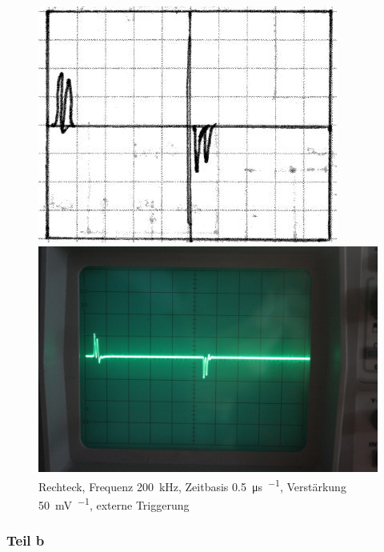 \begin{figure}
	\centering
	\begin{minipage}{.45\linewidth}
	\includegraphics[width=\linewidth]{Skizzen/IMG_0765-1500.jpg}
	\end{minipage}
	\hfill
	\begin{minipage}{.45\linewidth}
	\includegraphics[width=\linewidth]{Fotos/IMG_0765-1500.jpg}
	\end{minipage}
	\caption{%
		Rechteck, Frequenz \SI{200}{\kilo\hertz},
		Zeitbasis \SI{.5}{\micro\second\per\division},
		Verstärkung \SI{50}{\milli\volt\per\division},
		externe Triggerung
	}
	\label{fig:0765}
\end{figure}

\FloatBarrier
\subsubsection{Teil b}

